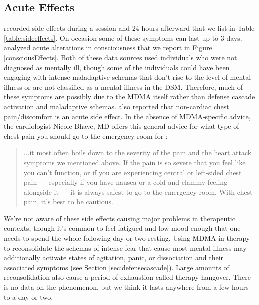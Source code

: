 \documentclass[12pt,letterpaper]{book}
\begin{document}
\subsection*{Acute Effects}
\label{acuteEffects}
\textcite{liechtiGender} recorded side effects during a session and 24 hours afterward that we list in Table \ref{table:sideeffects}. On occasion some of these symptoms can last up to 3 days. \textcite{studerus2010psychometric} analyzed acute alterations in consciousness that we report in Figure \ref{consciousEffects}. Both of these data sources used individuals who were not diagnosed as mentally ill, though some of the individuals could have been engaging with intense maladaptive schemas that don't rise to the level of mental illness or are not classified as a mental illness in the DSM. Therefore, much of these symptoms are possibly due to the MDMA itself rather than defense cascade activation and maladaptive schemas. \textcite{colcott2024side} also reported that non-cardiac chest pain/discomfort is an acute side effect. In the absence of MDMA-specific advice, the cardiologist Nicole Bhave, MD offers this general advice for what type of chest pain you should go to the emergency room for \cite{chestPain}:
\begin{quotation}
    ...it most often boils down to the severity of the pain and the heart attack symptoms we mentioned above. If the pain is so severe that you feel like you can’t function, or if you are experiencing central or left-sided chest pain — especially if you have nausea or a cold and clammy feeling alongside it — it is always safest to go to the emergency room. With chest pain, it’s best to be cautious.
\end{quotation}
We're not aware of these side effects causing major problems in therapeutic contexts, though it's common to feel fatigued and low-mood enough that one needs to spend the whole following day or two resting. Using MDMA in therapy to reconsolidate the schemas of intense fear that cause most mental illness may additionally activate states of agitation, panic, or dissociation and their associated symptoms (see Section \ref{sec:defensecascade}). Large amounts of reconsolidation also cause a period of exhaustion called therapy hangover. There is no data on the phenomenon, but we think it lasts anywhere from a few hours to a day or two.
\FloatBarrier
\end{document}
